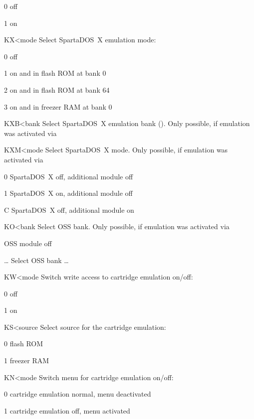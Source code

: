 \begin{fcmdlist}
\begin{fvallistn}
\item[0] off
\item[1] on
\end{fvallistn}
\item[KX{\textless}mode]
Select SpartaDOS~X emulation mode:
\begin{fvallistn}
\item[0] off
\item[1] on and in flash ROM at bank 0
\item[2] on and in flash ROM at bank 64
\item[3] on and in freezer RAM at bank 0
\end{fvallistn}
\item[KXB{\textless}bank]
Select SpartaDOS~X emulation bank ().
Only possible, if emulation was activated via 
\item[KXM{\textless}mode]
Select SpartaDOS~X mode. Only possible, if emulation was activated via
\begin{fvallistn}
\item[0] SpartaDOS~X off, additional module off
\item[1] SpartaDOS~X on, additional module off
\item[C] SpartaDOS~X off, additional module on
\end{fvallistn}
\item[KO{\textless}bank]
Select OSS bank. Only possible, if emulation was activated via
\begin{flistn}
\item[\fval{0}] OSS module off
\item[\fval{1}\dots\fval{3}] Select OSS bank \dots{}
\end{flistn}
\item[KW{\textless}mode]
Switch write access to cartridge emulation on/off:
\begin{fvallistn}
\item[0] off
\item[1] on
\end{fvallistn}

\clearpage

\item[KS{\textless}source]
Select source for the cartridge emulation:
\begin{fvallistn}
\item[0] flash ROM
\item[1] freezer RAM
\end{fvallistn}
\item[KN{\textless}mode]
Switch menu for cartridge emulation on/off:
\begin{fvallistn}
\item[0] cartridge emulation normal, menu deactivated
\item[1] cartridge emulation off, menu activated
\end{fvallistn}
\end{fcmdlist}

